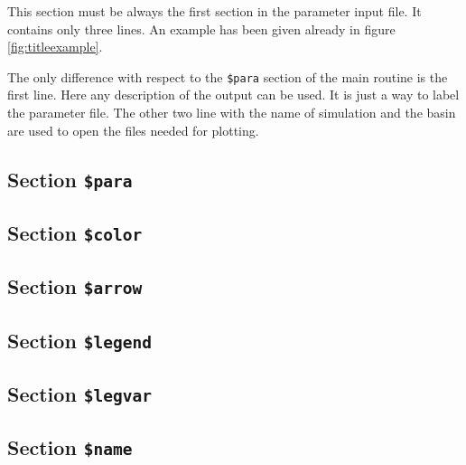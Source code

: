 \documentclass{report}
\begin{document}
This section must be always the first section in the parameter input file.
It contains only three lines. An example has been given already in 
figure \ref{fig:titleexample}.

The only difference with respect to the {\tt \$para} section of the main
routine is the first line. Here any description of the output can be used.
It is just a way to label the parameter file.  The other two line with
the name of simulation and the basin are used to open the files needed
for plotting.


\subsection{Section {\tt \$para}}




\subsection{Section {\tt \$color}}




\subsection{Section {\tt \$arrow}}




\subsection{Section {\tt \$legend}}




\subsection{Section {\tt \$legvar}}




\subsection{Section {\tt \$name}}










\end{document}
